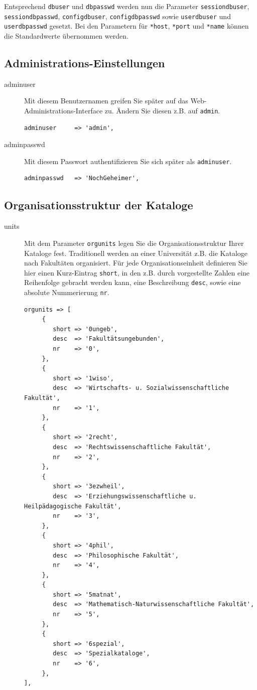 \documentclass[11pt, twoside, a4paper, BCOR8mm, DIV12, bibtotoc,idxtotoc]{scrbook}
\begin{document}
Entsprechend \texttt{dbuser} und \texttt{dbpasswd} werden nun die
Parameter \texttt{sessiondbuser}, \texttt{sessiondbpasswd},
\texttt{configdbuser}, \texttt{configdbpasswd} sowie
\texttt{userdbuser} und \texttt{userdbpasswd} gesetzt. Bei den
Parametern für \texttt{*host}, \texttt{*port} und \texttt{*name}
können die Standardwerte übernommen werden.



\subsection{Administrations-Einstellungen}
\label{ssec:admineinstellung}

\begin{description}
\item[adminuser] Mit diesem Benutzernamen greifen Sie später auf das
  Web-Administrations-Interface zu. Ändern Sie diesen z.B. auf
  \texttt{admin}.
\begin{verbatim}
adminuser     => 'admin',
\end{verbatim}
\item[adminpasswd] Mit diesem Passwort authentifizieren Sie sich
  später als \texttt{adminuser}.
\begin{verbatim}
adminpasswd   => 'NochGeheimer',
\end{verbatim}
\end{description}


\subsection{Organisationsstruktur der Kataloge}

\begin{description}
\item[units] Mit dem Parameter \texttt{orgunits} legen Sie die
  Organisationsstruktur Ihrer Kataloge fest. Traditionell werden an
  einer Universität z.B. die Kataloge nach Fakultäten
  organisiert. Für jede Organisationseinheit definieren Sie hier
  einen Kurz-Eintrag \texttt{short}, in den z.B. durch vorgestellte
  Zahlen eine Reihenfolge gebracht werden kann, eine Beschreibung
  \texttt{desc}, sowie eine absolute Nummerierung \texttt{nr}.
\begin{verbatim}
orgunits => [
     {
        short => '0ungeb',
        desc  => 'Fakultätsungebunden',
        nr    => '0',
     },
     {
        short => '1wiso',
        desc  => 'Wirtschafts- u. Sozialwissenschaftliche Fakultät',
        nr    => '1',
     },
     {
        short => '2recht',
        desc  => 'Rechtswissenschaftliche Fakultät',
        nr    => '2',
     },
     {
        short => '3ezwheil',
        desc  => 'Erziehungswissenschaftliche u. Heilpädagogische Fakultät',
        nr    => '3',
     },
     {
        short => '4phil',
        desc  => 'Philosophische Fakultät',
        nr    => '4',
     },
     {
        short => '5matnat',
        desc  => 'Mathematisch-Naturwissenschaftliche Fakultät',
        nr    => '5',
     },
     {
        short => '6spezial',
        desc  => 'Spezialkataloge',
        nr    => '6',
     },
],
\end{verbatim}
\end{description}
\end{document}
